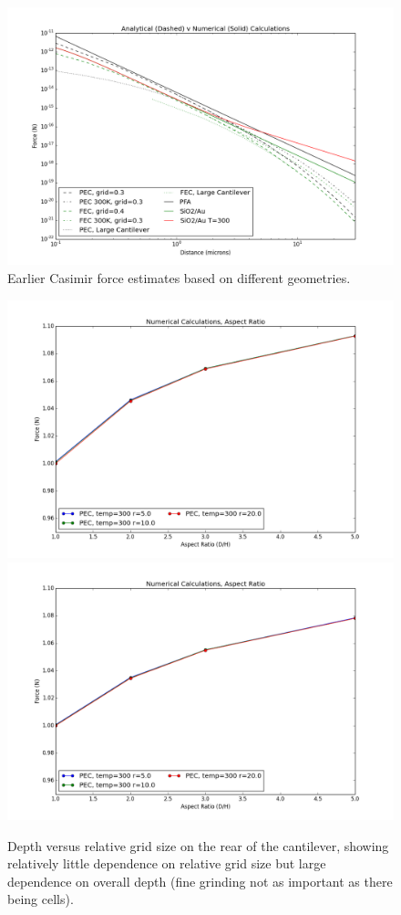 \documentclass[11pt]{article}
\begin{document}
\begin{figure}[h]
\centering
\includegraphics[width=7in]{analytic_v_numerical}
\caption{Earlier Casimir force estimates based on different geometries.}\label{fig:earlyEstimate}
\end{figure}

\begin{figure}[h]
\centering
\includegraphics[width=5.5in]{depth_v_gridding}
\includegraphics[width=5.5in]{depth_v_gridding_finite}
\caption{Depth versus relative grid size on the rear of the cantilever, showing relatively little dependence on relative grid size but large dependence on overall depth (fine grinding not as important as there being cells).}\label{fig:depth}
\end{figure}
\end{document}
